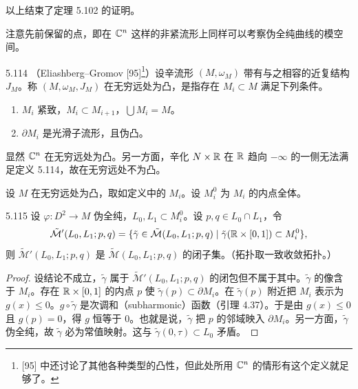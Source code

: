 以上结束了定理 5.102 的证明。

注意先前保留的点，即在 $\mathbb{C}^n$ 这样的非紧流形上同样可以考察伪全纯曲线的模空间。

\begin{definition}{5.114}
  （Eliashberg–Gromov [95]\footnote{[95] 中还讨论了其他各种类型的凸性，但此处所用 $\mathbb{C}^n$ 的情形有这个定义就足够了。}）设辛流形 $(M,\omega_M)$ 带有与之相容的近复结构 $J_M$。称 $(M,\omega_M,J_M)$ 在无穷远处为凸，是指存在 $M_i\subset M$ 满足下列条件。
  \begin{enumerate}[label=(\arabic*),leftmargin=2.4em,itemsep=1pt,topsep=2pt]
    \item $M_i$ 紧致，$M_i\subset M_{i+1}$，$\bigcup M_i=M$。
    \item $\partial M_i$ 是光滑子流形，且伪凸。
  \end{enumerate}
\end{definition}

显然 $\mathbb{C}^n$ 在无穷远处为凸。另一方面，辛化 $N\times\mathbb{R}$ 在 $\mathbb{R}$ 趋向 $-\infty$ 的一侧无法满足定义 5.114，故在无穷远处不为凸。

设 $M$ 在无穷远处为凸，取如定义中的 $M_i$。设 $M_i^0$ 为 $M_i$ 的内点全体。

\begin{lemma*}{5.115}
  设 $\varphi\colon D^2\to M$ 伪全纯，$L_0,L_1\subset M^0_i$。设 $p,q\in L_0\cap L_1$，令
  \[
    \tilde{\mathcal{M}}'(L_0,L_1;p,q)=\{\tilde\gamma\in\tilde{\mathcal{M}}(L_0,L_1;p,q)\mid \tilde\gamma(\mathbb{R}\times[0,1])\subset M^0_i\},
  \]
  则 $\tilde{\mathcal{M}}'(L_0,L_1;p,q)$ 是 $\tilde{\mathcal{M}}(L_0,L_1;p,q)$ 的闭子集。（拓扑取一致收敛拓扑。）
\end{lemma*}

\begin{proof}
  设结论不成立，$\tilde\gamma$ 属于 $\tilde{\mathcal{M}}'(L_0,L_1;p,q)$ 的闭包但不属于其中。$\tilde\gamma$ 的像含于 $M_i$。存在 $\mathbb{R}\times[0,1]$ 的内点 $p$ 使 $\tilde\gamma(p)\subset\partial M_i$。在 $\tilde\gamma(p)$ 附近把 $M_i$ 表示为 $g(x)\le0$。$g\circ\tilde\gamma$ 是次调和（subharmonic）函数（引理 4.37）。于是由 $g(x)\le0$ 且 $g(p)=0$，得 $g$ 恒等于 0。也就是说，$\tilde\gamma$ 把 $p$ 的邻域映入 $\partial M_i$。另一方面，$\tilde\gamma$ 伪全纯，故 $\tilde\gamma$ 必为常值映射。这与 $\tilde\gamma(0,\tau)\subset L_0$ 矛盾。
\end{proof}

